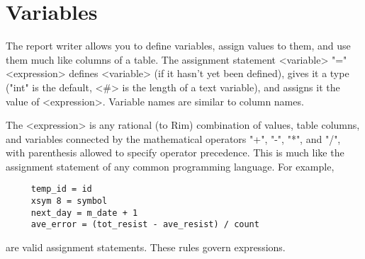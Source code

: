 \section{Variables}
%
The report writer allows you to define variables, assign values to
them, and use them much like columns of a table.
The assignment statement
\<<variable>  "="
     <expression>\>
defines <variable> (if it hasn't yet been defined), gives it
a type ("int" is the default, <\#> is the length of a text variable),
and assigns it the value of <expression>.
Variable names are similar to column names.
 
The <expression> is any rational (to Rim) combination of values,
table columns, and variables connected by the
mathematical operators "+", "-", "*", and "/", with parenthesis
allowed to specify operator precedence.
This is much like the assignment statement of any common programming
language. For example,
 
\begin{verbatim}
     temp_id = id
     xsym 8 = symbol
     next_day = m_date + 1
     ave_error = (tot_resist - ave_resist) / count
\end{verbatim}
 
are valid assignment statements.  These rules govern
expressions.
 
